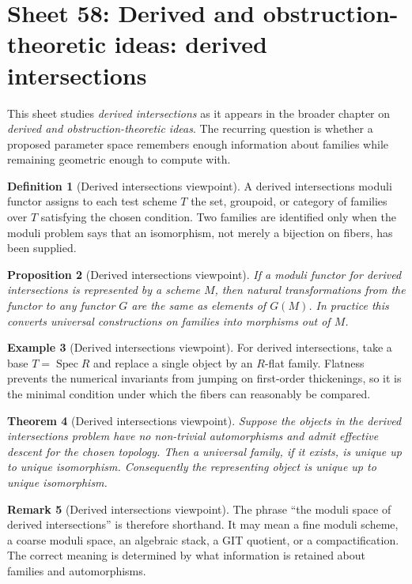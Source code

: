 \documentclass[11pt]{amsart}
\newtheorem{theorem}{Theorem}[section]
\newtheorem{proposition}[theorem]{Proposition}
\theoremstyle{definition}
\newtheorem{definition}[theorem]{Definition}
\newtheorem{example}[theorem]{Example}
\newtheorem{remark}[theorem]{Remark}
\newcommand{\Spec}{\operatorname{Spec}}
\begin{document}
\section{Sheet 58: Derived and obstruction-theoretic ideas: derived intersections}
This sheet studies \emph{derived intersections} as it appears in the broader chapter on \emph{derived and obstruction-theoretic ideas}.  The recurring question is whether a proposed parameter space remembers enough information about families while remaining geometric enough to compute with.
\begin{definition}[Derived intersections viewpoint]
A derived intersections moduli functor assigns to each test scheme $T$ the set, groupoid, or category of families over $T$ satisfying the chosen condition.  Two families are identified only when the moduli problem says that an isomorphism, not merely a bijection on fibers, has been supplied.
\end{definition}
\begin{proposition}[Derived intersections viewpoint]
If a moduli functor for derived intersections is represented by a scheme $M$, then natural transformations from the functor to any functor $G$ are the same as elements of $G(M)$.  In practice this converts universal constructions on families into morphisms out of $M$.
\end{proposition}
\begin{example}[Derived intersections viewpoint]
For derived intersections, take a base $T=\Spec R$ and replace a single object by an $R$-flat family.  Flatness prevents the numerical invariants from jumping on first-order thickenings, so it is the minimal condition under which the fibers can reasonably be compared.
\end{example}
\begin{theorem}[Derived intersections viewpoint]
Suppose the objects in the derived intersections problem have no non-trivial automorphisms and admit effective descent for the chosen topology.  Then a universal family, if it exists, is unique up to unique isomorphism.  Consequently the representing object is unique up to unique isomorphism.
\end{theorem}
\begin{remark}[Derived intersections viewpoint]
The phrase ``the moduli space of derived intersections'' is therefore shorthand.  It may mean a fine moduli scheme, a coarse moduli space, an algebraic stack, a GIT quotient, or a compactification.  The correct meaning is determined by what information is retained about families and automorphisms.
\end{remark}
\end{document}
